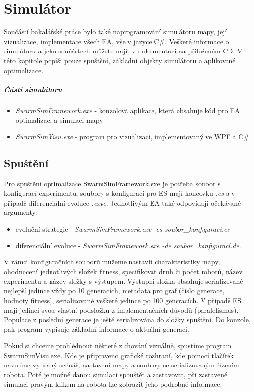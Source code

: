 
\chapter{Simulátor}
Součástí bakalářské práce bylo také naprogramování simulátoru mapy, její vizualizace, implementace všech EA, vše v jazyce C\#. Veškeré informace o simulátoru a jeho součástech můžete najít v dokumentaci na přiloženém CD. V této kapitole popíši pouze spuštění, základní objekty simulátoru a aplikované optimalizace. \par 
\paragraph{Části simulátoru}
\begin{itemize}
	\item \textit{SwarmSimFramework.exe} - konzolová aplikace, která obsahuje kód pro EA optimalizaci a simulaci mapy
	\item \textit{SwarmSimVisu.exe} - program pro vizualizaci, implementovaný ve WPF a C\# 
\end{itemize}

\section*{Spuštění}
Pro spuštění optimalizace SwarmSimFramework.exe je potřeba soubor s konfigurací experimentu, soubory s konfigurací pro ES mají koncovku \textit{.es} a v případě diferenciální evoluce \textit{.expe}. Jednotlivým EA také odpovídají očekávané argumenty. 
\begin{itemize}
	\item evoluční strategie - \textit{SwarmSimFramework.exe -es soubor\_konfigurací.es}  
	\item diferenciální evoluce - \textit{SwarmSimFramework.exe -de soubor\_konfigurací.de}. 
\end{itemize}
\par 
V rámci konfiguračních souborů můžeme nastavit charakteristiky mapy, ohodnocení jednotlivých složek fitness, specifikovat druh či počet robotů, název experimentu a název složky s výstupem. Výstupní složka obsahuje serializované nejlepší jedince vždy po 10 generacích, metadata pro graf (číslo generace, hodnoty fitness), serializované veškeré jedince po 100 generacích. V případě ES mají jedinci svou vlastní podsložku z implementačních důvodů (paralelismus). Populace z poslední generace je ještě serializována do složky spuštění. Do konzole, pak program vypisuje základní informace o aktuální generaci.
\par 
Pokud si chceme prohlédnout některé z chování vizuálně, spustíme program SwarmSimVisu.exe. Kde je připraveno grafické rozhraní, kde pomocí tlačítek navolíme vybraný scénář, nastavení mapy a soubory se serializovaným řízením robota. Poté je možné danou simulaci spouštět a zastavovat, při zastavené simulaci pravým klikem na robota lze zobrazit jeho podrobné informace.

